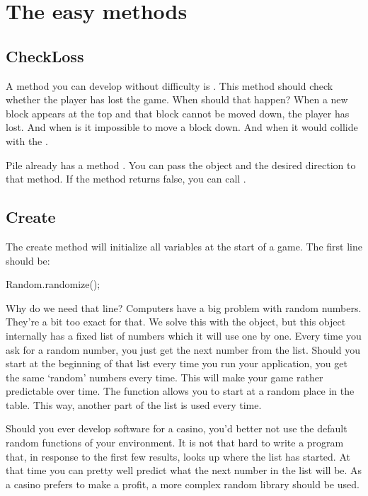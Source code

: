 \section{The easy methods}
\subsection{CheckLoss}
A method you can develop without difficulty is . This method should check whether the player has lost the game. When should that happen? When a new block appears at the top and that block cannot be moved down, the player has lost. And when is it impossible to move a block down. And when it would collide with the . 

Pile already has a method . You can pass the object  and the desired direction to that method. If the method returns false, you can call .

\subsection{Create}
The create method will initialize all variables at the start of a game. The first line should be:

\begin{code}
Random.randomize();
\end{code}

Why do we need that line? Computers have a big problem with random numbers. They're a bit too exact for that. We solve this with the  object, but this object internally has a fixed list of numbers which it will use one by one. Every time you ask for a random number, you just get the next number from the list. Should you start at the beginning of that list every time you run your application, you get the same `random' numbers every time. This will make your game rather predictable over time. The function  allows you to start at a random place in the table. This way, another part of the list is used every time.

\begin{note}
Should you ever develop software for a casino, you'd better not use the default random functions of your environment. It is not that hard to write a program that, in response to the first few results, looks up where the list has started. At that time you can pretty well predict what the next number in the list will be. As a casino prefers to make a profit, a more complex random library should be used.
\end{note}

